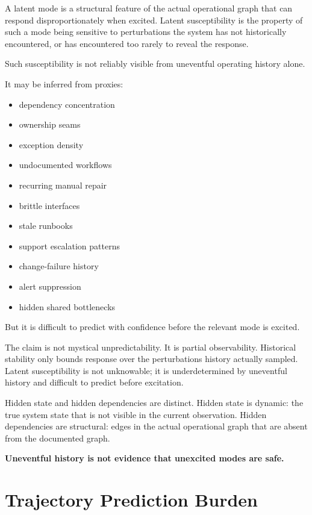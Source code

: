 \documentclass[11pt]{article}
\begin{document}
A latent mode is a structural feature of the actual operational graph that can respond disproportionately when excited. Latent susceptibility is the property of such a mode being sensitive to perturbations the system has not historically encountered, or has encountered too rarely to reveal the response.

Such susceptibility is not reliably visible from uneventful operating history alone.

It may be inferred from proxies:
\begin{itemize}
\item dependency concentration
\item ownership seams
\item exception density
\item undocumented workflows
\item recurring manual repair
\item brittle interfaces
\item stale runbooks
\item support escalation patterns
\item change-failure history
\item alert suppression
\item hidden shared bottlenecks
\end{itemize}

But it is difficult to predict with confidence before the relevant mode is excited.

The claim is not mystical unpredictability. It is partial observability. Historical stability only bounds response over the perturbations history actually sampled. Latent susceptibility is not unknowable; it is underdetermined by uneventful history and difficult to predict before excitation.

Hidden state and hidden dependencies are distinct. Hidden state is dynamic: the true system state that is not visible in the current observation. Hidden dependencies are structural: edges in the actual operational graph that are absent from the documented graph.

\begin{pullquote}
\textbf{Uneventful history is not evidence that unexcited modes are safe.}
\end{pullquote}

\section{Trajectory Prediction Burden}
\end{document}
